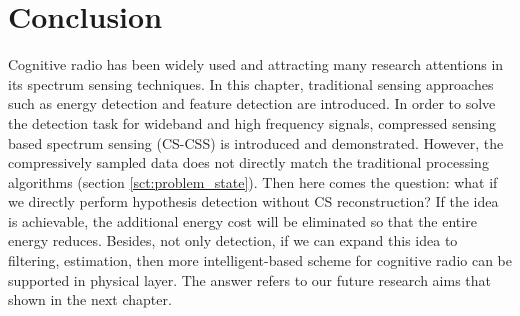 \section{Conclusion}
\indent \indent Cognitive radio has been widely used and attracting many research attentions in its spectrum sensing techniques. In this chapter, traditional sensing approaches such as energy detection and feature detection are introduced. In order to solve the detection task for wideband and high frequency signals, compressed sensing based spectrum sensing (CS-CSS) is introduced and demonstrated. However, the compressively sampled data does not directly match the traditional processing algorithms (section \ref{sct:problem_state}). Then here comes the question: what if we directly perform hypothesis detection without CS reconstruction? If the idea is achievable, the additional energy cost will be eliminated so that the entire energy reduces. Besides, not only detection, if we can expand this idea to filtering, estimation, then more intelligent-based scheme for cognitive radio can be supported in physical layer. The answer refers to our future research aims that shown in the next chapter.





